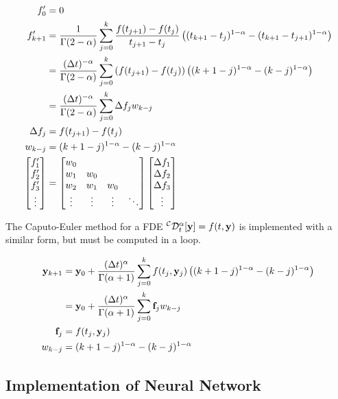 \documentclass{article}
\begin{document}
	\begin{align}
		f'_{0} &= 0 \\
		f'_{k + 1} &= \frac{1}{\Gamma(2 - \alpha)} \sum_{j = 0}^{k} \frac{f(t_{j + 1}) - f(t_{j})}{t_{j + 1} - t_{j}} \left( (t_{k + 1} - t_{j})^{1 - \alpha} - (t_{k + 1} - t_{j + 1})^{1 - \alpha} \right) \\
		&= \frac{(\Delta t)^{-\alpha}}{\Gamma(2 - \alpha)} \sum_{j = 0}^{k} \left( f(t_{j + 1}) - f(t_{j}) \right) \left( (k + 1 - j)^{1 - \alpha} - (k - j)^{1 - \alpha} \right) \\
		&= \frac{(\Delta t)^{-\alpha}}{\Gamma(2 - \alpha)} \sum_{j = 0}^{k} \Delta f_{j} w_{k - j} \\
		\Delta f_{j} &= f(t_{j + 1}) - f(t_{j}) \\
		w_{k - j} &= (k + 1 - j)^{1 - \alpha} - (k - j)^{1 - \alpha} \\
		\bmqty{
			f'_{1} \\
			f'_{2} \\
			f'_{3} \\
			\vdots
		} &= \bmqty{
			w_{0} &  &  &   \\
			w_{1} & w_{0} &  &  \\
			w_{2} & w_{1} & w_{0} &  \\
			\vdots & \vdots & \vdots & \ddots
		} \bmqty{
			\Delta f_{1} \\
			\Delta f_{2} \\
			\Delta f_{3} \\
			\vdots
		}
	\end{align}
	
	The Caputo-Euler method for a FDE $^{\mathcal{C}}\mathcal{D}_{t}^{\alpha} [\vb{y}] = f(t, \vb{y})$ is implemented with a similar form, but must be computed in a loop.
	
	\begin{align}
		\vb{y}_{k + 1} &= \vb{y}_{0} + \frac{(\Delta t)^{\alpha}}{\Gamma(\alpha + 1)} \sum_{j = 0}^{k} f(t_{j}, \vb{y}_{j}) \left( (k + 1 - j)^{1 - \alpha} - (k - j)^{1 - \alpha} \right) \\
		&= \vb{y}_{0} + \frac{(\Delta t)^{\alpha}}{\Gamma(\alpha + 1)} \sum_{j = 0}^{k} \vb{f}_{j} w_{k - j} \\
		\vb{f}_{j} &= f(t_{j}, \vb{y}_{j}) \\
		w_{k - j} &= (k + 1 - j)^{1 - \alpha} - (k - j)^{1 - \alpha}
	\end{align}
	
	\subsection{Implementation of Neural Network}
	\label{subsection:Implementation_of_Neural_Network}
	
\end{document}
